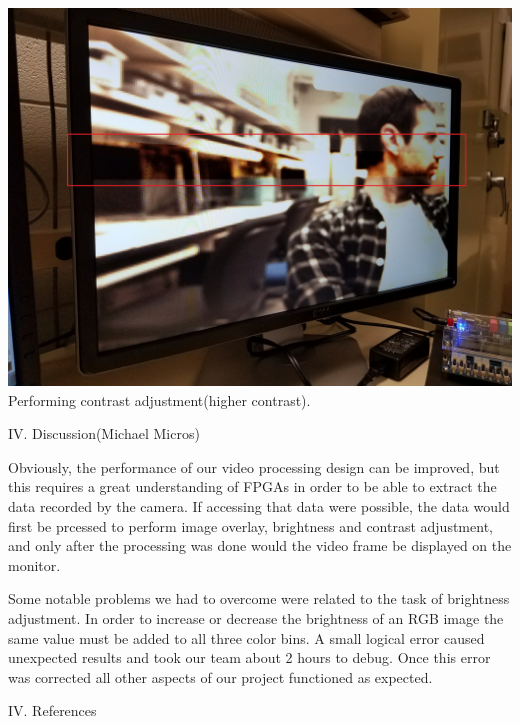 \documentclass{article}
\newenvironment{Figure}
  {\par\medskip\noindent\ignorespaces\minipage{\linewidth}}
  {\endminipage\par\medskip}
\begin{document}
\begin{multicols*}{2}
\begin{Figure}
 \centering
 \includegraphics[width=\linewidth, height = 10 cm]{contrast_increase.jpg}
 {Performing contrast adjustment(higher contrast).}
\end{Figure}

\begin{center}
\large{IV. Discussion(Michael Micros)}
\end{center}

Obviously, the performance of our video processing design can be improved, but this requires a great understanding of FPGAs in order to be able to extract the data recorded by the camera. If accessing that data were possible, the data would first be prcessed to perform image overlay, brightness and contrast adjustment, and only after the processing was done would the video frame be displayed on the monitor.

 Some notable problems we had to overcome were related to the task of brightness adjustment. In order to increase or decrease the brightness of an RGB image the same value must be added to all three color bins. A small logical error caused unexpected results and took our team about 2 hours to debug. Once this error was corrected all other aspects of our project functioned as expected.




\begin{center}
\large{IV. References}
\end{center}


\end{multicols*}
\end{document}
